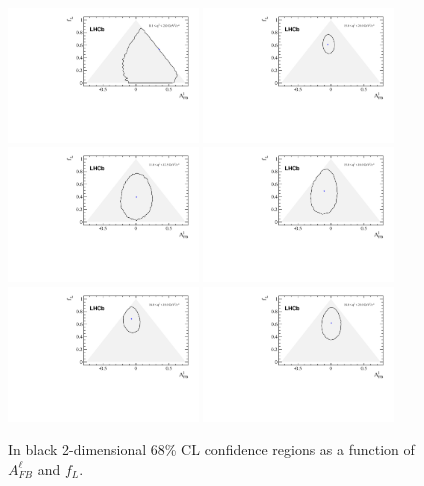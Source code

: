 \begin{figure}[h]
\centering
\includegraphics[width=0.45\textwidth]{Lmumu/figs/Contours/contours_010_200_1D.pdf}
\includegraphics[width=0.45\textwidth]{Lmumu/figs/Contours/contours_1500_2000_1D.pdf}
\includegraphics[width=0.45\textwidth]{Lmumu/figs/Contours/contours_1100_1250_1D.pdf}
\includegraphics[width=0.45\textwidth]{Lmumu/figs/Contours/contours_1500_1600_1D.pdf}
\includegraphics[width=0.45\textwidth]{Lmumu/figs/Contours/contours_1600_1800_1D.pdf}
\includegraphics[width=0.45\textwidth]{Lmumu/figs/Contours/contours_1800_2000_1D.pdf}
\caption{In black 2-dimensional 68\% CL confidence regions as a function of $A_{FB}^\ell$ and $f_L$. }
\label{fig:contours}
\end{figure}
